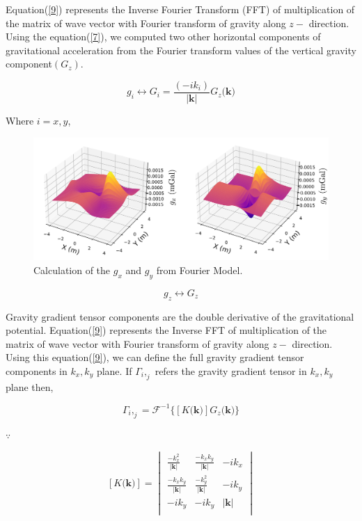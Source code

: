 \documentclass[a4paper,11pt]{article}
\begin{document}
Equation(\ref{9}) represents the Inverse Fourier Transform (FFT) of multiplication of the matrix of wave vector with Fourier transform of gravity along $z-$ direction. Using the equation(\ref{7}), we computed two other horizontal components of gravitational acceleration from the Fourier transform values of the vertical gravity component$(G_{z})$.
 
\begin{equation}\label{7}
g_{i} \leftrightarrow G_{i}= \frac{(-ik_{i})}{|\textbf{k}|}G_{z}\textbf{(k)}
\end{equation}

\noindent Where $i= x,y$, 
\begin{figure}[ht]
    \centering
    \includegraphics[scale= 0.65]{plots/mass_anomaly_g_x_y.png}
    \caption{Calculation of the $g_{x}$ and $g_{y}$ from Fourier Model.}
\end{figure}

\begin{equation} \label{8}
g_{z} \leftrightarrow G_{z} 
\end{equation}


\noindent Gravity gradient tensor components are the double derivative of the gravitational potential. Equation(\ref{9}) represents the Inverse FFT of multiplication of the matrix of wave vector with Fourier transform of gravity along $z-$ direction. Using this equation(\ref{9}), we can define the full gravity gradient tensor components in ${k_{x}, k_{y}}$ plane. If \textbf{$\Gamma_{i},_{j}$} refers the gravity gradient tensor in $k_{x},k_{y}$ plane then,

\begin{equation} \label{9}
\textbf{$\Gamma_i,_j$}= \mathcal{F}^{-1} \{[K\textbf{(k)}] G_z\textbf{(k)}\} 
\end{equation}

$\because$

\begin{equation}\label{eq_cal3_2}
 {[K\textbf{(k)}]}
=\begin{vmatrix}
\frac{-k_x^2}{|\textbf{k}|} & \frac{-k_x k_y }{|\textbf{k}|} & -i k_x \\
\frac{-k_x k_y}{|\textbf{k}|} & \frac{-k_y^2}{|\textbf{k}|} & -i k_y\\
-i k_y & - i k_y  & {|\textbf{k}|}\\
\end{vmatrix}
\end{equation}
\end{document}
